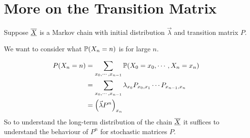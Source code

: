 \documentclass[../Main.tex]{subfiles}
\begin{document}
\section{More on the Transition Matrix}
Suppose $\chain{X}$ is a Markov chain with initial distribution $\vec{\lambda}$ and transition matrix $P$.

We want to consider what $\P(X_n = n)$ is for large $n$.

\begin{align*}
    P(X_n = n) &= \sum_{x_0, \cdots, x_{n - 1}} \P(X_0 = x_0, \cdots, X_n = x_n) \\
    &= \sum_{x_0, \cdots, x_{n-1}} \lambda_{x_0} \Pmat{0}{1} \cdots \Pmat{n-1}{n} \\
    &= \left(\vec{\lambda} P^n\right)_{x_n}
\end{align*}
So to understand the long-term distribution of the chain $\chain{X}$ it suffices to understand the behaviour of $P^n$ for stochastic matrices $P$.
\end{document}

